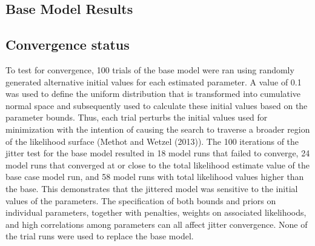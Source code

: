 \documentclass[11pt,
  english,
  a4paper,
]{article}
\begin{document}
\leavevmode\tagmcend\tagstructend\par


\hypertarget{base-model-results}{%
\subsection{Base Model Results}\label{base-model-results}}

\leavevmode\tagmcend\tagstructend


\hypertarget{convergence-status}{%
\subsection{Convergence status}\label{convergence-status}}

\leavevmode\tagmcend\tagstructend


To test for convergence, 100 trials of the base model were ran using randomly generated alternative initial values for each estimated parameter. A value of 0.1 was used to define the uniform distribution that is transformed into cumulative normal space and subsequently used to calculate these initial values based on the parameter bounds. Thus, each trial perturbs the initial values used for minimization with the intention of causing the search to traverse a broader region of the likelihood surface ({Methot and Wetzel (2013)\leavevmode\tagmcend\tagstructend}). The 100 iterations of the jitter test for the base model resulted in 18 model runs that failed to converge, 24 model runs that converged at or close to the total likelihood estimate value of the base case model run, and 58 model runs with total likelihood values higher than the base. This demonstrates that the jittered model was sensitive to the initial values of the parameters. The specification of both bounds and priors on individual parameters, together with penalties, weights on associated likelihoods, and high correlations among parameters can all affect jitter convergence. None of the trial runs were used to replace the base model.

\leavevmode\tagmcend\tagstructend\par

\end{document}
